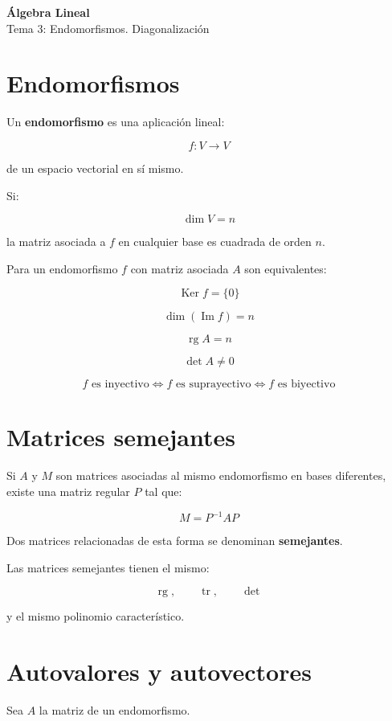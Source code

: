 \documentclass[11pt,a4paper]{article}
\newcommand{\Ker}{\operatorname{Ker}}
\newcommand{\Ima}{\operatorname{Im}}
\newcommand{\rg}{\operatorname{rg}}
\newcommand{\tr}{\operatorname{tr}}
\begin{document}
\begin{center}
{\LARGE\bfseries Álgebra Lineal}\\[0.4em]
{\Large Tema 3: Endomorfismos. Diagonalización}
\end{center}

\tableofcontents
\newpage

\section{Endomorfismos}

Un \textbf{endomorfismo} es una aplicación lineal:

\[
f:V\longrightarrow V
\]

de un espacio vectorial en sí mismo.

Si:

\[
\dim V=n
\]

la matriz asociada a $f$ en cualquier base es cuadrada de orden $n$.

Para un endomorfismo $f$ con matriz asociada $A$ son equivalentes:

\[
\Ker f=\{0\}
\]

\[
\dim(\Ima f)=n
\]

\[
\rg A=n
\]

\[
\det A\neq 0
\]

\[
f\text{ es inyectivo}
\iff
f\text{ es suprayectivo}
\iff
f\text{ es biyectivo}
\]

\section{Matrices semejantes}

Si $A$ y $M$ son matrices asociadas al mismo endomorfismo en bases diferentes, existe una matriz regular $P$ tal que:

\[
\boxed{
M=P^{-1}AP
}
\]

Dos matrices relacionadas de esta forma se denominan \textbf{semejantes}.

Las matrices semejantes tienen el mismo:

\[
\boxed{
\rg,\qquad \tr,\qquad \det
}
\]

y el mismo polinomio característico.

\section{Autovalores y autovectores}

Sea $A$ la matriz de un endomorfismo.
\end{document}
